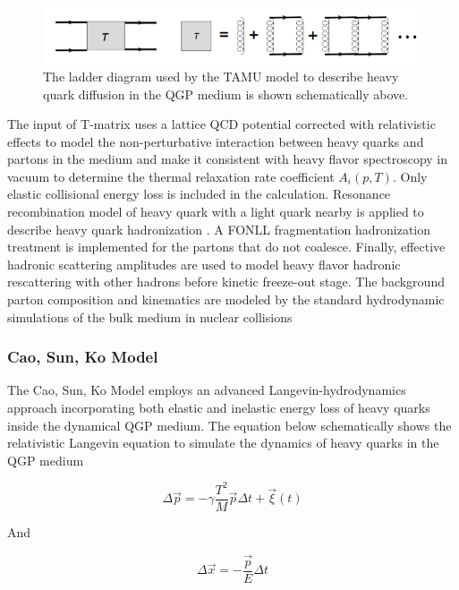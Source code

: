  \begin{figure}[hbtp]
\begin{center}
\includegraphics[width=1.0\textwidth]{Figures/Chapter1/LadderDiagram.png}
\caption{The ladder diagram used by the TAMU model to describe heavy quark diffusion in the QGP medium is shown schematically above.}
\label{LadderDiagram}
\end{center}
\end{figure}  

The input of T-matrix uses a lattice QCD potential \cite{LQCDTAMU} corrected with relativistic effects to model the non-perturbative interaction between heavy quarks and partons in the medium and make it consistent with heavy flavor spectroscopy in vacuum to determine the thermal relaxation rate coefficient $A_i(p,T)$. Only elastic collisional energy loss is included in the calculation. Resonance recombination model of heavy quark with a light quark nearby is applied to describe heavy quark hadronization \cite{RRM1}. A FONLL fragmentation hadronization treatment is implemented for the partons that do not coalesce. Finally, effective hadronic scattering amplitudes are used to model heavy flavor hadronic rescattering with other hadrons before kinetic freeze-out stage. The background parton composition and kinematics are modeled by the standard hydrodynamic simulations of the bulk medium in nuclear collisions

\subsubsection{Cao, Sun, Ko Model}

The Cao, Sun, Ko Model employs an advanced Langevin-hydrodynamics approach \cite{CaoLH1,CaoLH2} incorporating both elastic and inelastic energy loss of heavy quarks inside the dynamical QGP medium. The equation below schematically shows the relativistic Langevin equation to simulate the dynamics of heavy quarks in the QGP medium


\begin{equation}
\Delta \vec{p} = - \gamma \frac{T^2}{M} \vec{p} \Delta t + \vec{\xi}(t) 
\end{equation}

And

\begin{equation}
\Delta \vec{x} = - \frac{\vec{p}}{E} \Delta t
\end{equation}

